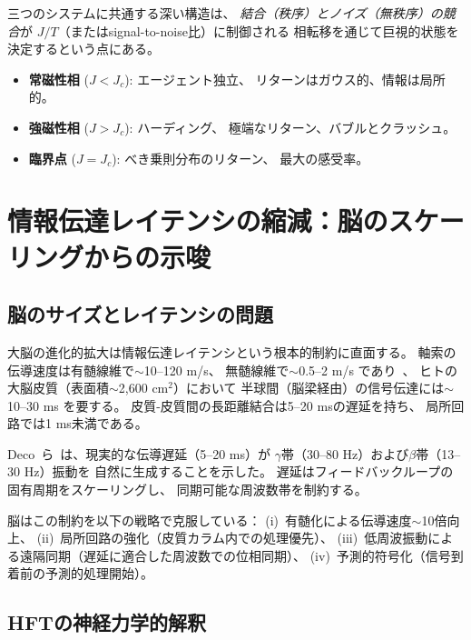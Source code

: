 \documentclass[12pt,twocolumn]{ltjsarticle}
\begin{document}
三つのシステムに共通する深い構造は、
\emph{結合（秩序）とノイズ（無秩序）の競合}が
$J/T$（またはsignal-to-noise比）に制御される
相転移を通じて巨視的状態を決定するという点にある。

\begin{itemize}
\item \textbf{常磁性相} ($J < J_c$): エージェント独立、
リターンはガウス的、情報は局所的。
\item \textbf{強磁性相} ($J > J_c$): ハーディング、
極端なリターン、バブルとクラッシュ。
\item \textbf{臨界点} ($J = J_c$): べき乗則分布のリターン、
最大の感受率。
\end{itemize}


\section{情報伝達レイテンシの縮減：脳のスケーリングからの示唆}
\label{sec:latency}

\subsection{脳のサイズとレイテンシの問題}

大脳の進化的拡大は情報伝達レイテンシという根本的制約に直面する。
軸索の伝導速度は有髄線維で$\sim$10--120 m/s、
無髄線維で$\sim$0.5--2 m/s であり~\cite{Ringo1994}、
ヒトの大脳皮質（表面積$\sim$2,600 cm$^2$）において
半球間（脳梁経由）の信号伝達には$\sim$10--30 ms を要する。
皮質-皮質間の長距離結合は5--20 msの遅延を持ち、
局所回路では1 ms未満である。

Deco~ら~\cite{Deco2009}は、現実的な伝導遅延（5--20 ms）が
$\gamma$帯（30--80 Hz）および$\beta$帯（13--30 Hz）振動を
自然に生成することを示した。
遅延はフィードバックループの固有周期をスケーリングし、
同期可能な周波数帯を制約する。

脳はこの制約を以下の戦略で克服している：
(i)~有髄化による伝導速度$\sim$10倍向上、
(ii)~局所回路の強化（皮質カラム内での処理優先）、
(iii)~低周波振動による遠隔同期（遅延に適合した周波数での位相同期）、
(iv)~予測的符号化（信号到着前の予測的処理開始）。

\subsection{HFTの神経力学的解釈}
\end{document}
